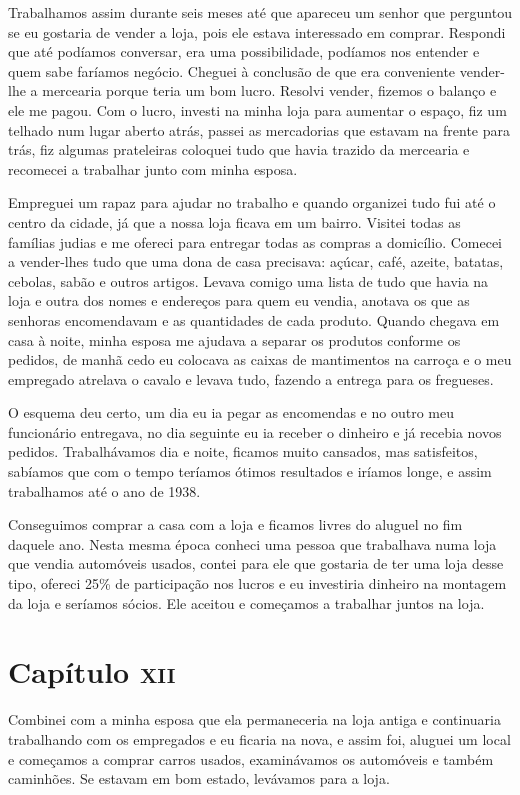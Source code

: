 Trabalhamos assim durante seis meses até que apareceu um senhor que
perguntou se eu gostaria de vender a loja, pois ele estava interessado
em comprar. Respondi que até podíamos conversar, era uma possibilidade,
podíamos nos entender e quem sabe faríamos negócio. Cheguei à conclusão
de que era conveniente vender-lhe a mercearia porque teria um bom lucro.
Resolvi vender, fizemos o balanço e ele me pagou. Com o lucro, investi
na minha loja para aumentar o espaço, fiz um telhado num lugar aberto
atrás, passei as mercadorias que estavam na frente para trás, fiz
algumas prateleiras coloquei tudo que havia trazido da mercearia e
recomecei a trabalhar junto com minha esposa.

Empreguei um rapaz para ajudar no trabalho e quando organizei tudo fui
até o centro da cidade, já que a nossa loja ficava em um bairro. Visitei
todas as famílias judias e me ofereci para entregar todas as compras a
domicílio. Comecei a vender-lhes tudo que uma dona de casa precisava:
açúcar, café, azeite, batatas, cebolas, sabão e outros artigos. Levava
comigo uma lista de tudo que havia na loja e outra dos nomes e endereços
para quem eu vendia, anotava os que as senhoras encomendavam e as
quantidades de cada produto. Quando chegava em casa à noite, minha
esposa me ajudava a separar os produtos conforme os pedidos, de manhã
cedo eu colocava as caixas de mantimentos na carroça e o meu empregado
atrelava o cavalo e levava tudo, fazendo a entrega para os fregueses.

O esquema deu certo, um dia eu ia pegar as encomendas e no outro meu
funcionário entregava, no dia seguinte eu ia receber o dinheiro e já
recebia novos pedidos. Trabalhávamos dia e noite, ficamos muito
cansados, mas satisfeitos, sabíamos que com o tempo teríamos ótimos
resultados e iríamos longe, e assim trabalhamos até o ano de 1938.

Conseguimos comprar a casa com a loja e ficamos livres do aluguel no fim
daquele ano. Nesta mesma época conheci uma pessoa que trabalhava numa
loja que vendia automóveis usados, contei para ele que gostaria de ter
uma loja desse tipo, ofereci 25\% de participação nos lucros e eu
investiria dinheiro na montagem da loja e seríamos sócios. Ele aceitou e
começamos a trabalhar juntos na loja.

\chapter{Capítulo \textsc{xii}}

Combinei com a minha esposa que ela permaneceria na loja antiga e
continuaria trabalhando com os empregados e eu ficaria na nova, e assim
foi, aluguei um local e começamos a comprar carros usados, examinávamos
os automóveis e também caminhões. Se estavam em bom estado, levávamos
para a loja.

